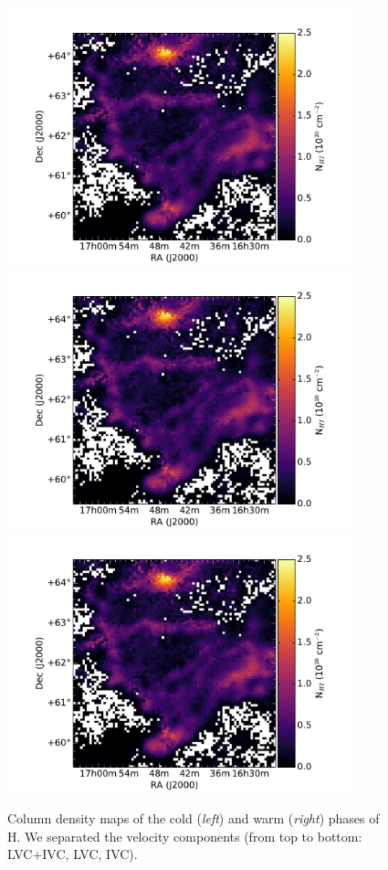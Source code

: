 \documentclass[traditabstract]{aa}
\begin{document}
\begin{figure}[h]
  \hspace{5mm}
  \includegraphics[page=5,height=7.5cm,trim=110 35 105 75,clip=true]{Figures/GHIGLS_NHI.pdf} \\
  \vspace{5mm}
  \includegraphics[page=3,height=7.5cm,trim=110 35 105 75,clip=true]{Figures/GHIGLS_NHI.pdf}
  \hspace{5mm}
  \includegraphics[page=6,height=7.5cm,trim=110 35 105 75,clip=true]{Figures/GHIGLS_NHI.pdf}
  \caption{\label{Phases_GHIGLS} Column density maps of the cold (\emph{left}) and warm (\emph{right}) phases of H. We separated the velocity components (from top to bottom: LVC+IVC, LVC, IVC).}
\end{figure}
\end{document}
